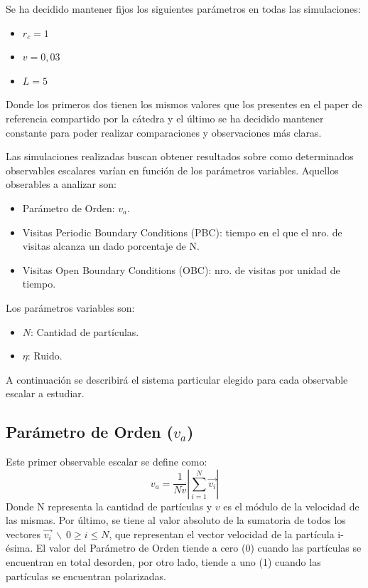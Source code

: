 \documentclass[11pt]{article}
\begin{document}
        Se ha decidido mantener fijos los siguientes parámetros en todas las simulaciones:
        \begin{itemize}
            \item $r_c = 1$
            \item $v = 0,03$
            \item $L = 5$
        \end{itemize}
        Donde los primeros dos tienen los mismos valores que los presentes en el paper de referencia
        compartido por la cátedra y el último se ha decidido mantener constante para poder realizar comparaciones
        y observaciones más claras.

        Las simulaciones realizadas buscan obtener resultados sobre como determinados observables escalares varían
        en función de los parámetros variables. Aquellos obserables a analizar son:
        \begin{itemize}
            \item Parámetro de Orden: $v_a$.
            \item Visitas Periodic Boundary Conditions (PBC): tiempo en el que el nro. de visitas alcanza un dado porcentaje de N.
            \item Visitas Open Boundary Conditions (OBC): nro. de visitas por unidad de tiempo.
        \end{itemize}
        Los parámetros variables son:
        \begin{itemize}
            \item $N$: Cantidad de partículas.
            \item $\eta$: Ruido.
        \end{itemize}

        A continuación se describirá el sistema particular elegido para cada observable escalar a estudiar.

        \subsection{Parámetro de Orden ($v_a$)}
            Este primer observable escalar se define como:
            \begin{equation}
                v_a = \frac{1}{Nv} \left|\sum_{i=1}^{N} \vec{v_i} \right|
            \end{equation}
            Donde N representa la cantidad de partículas y $v$ es el módulo de la velocidad de las mismas. Por último,
            se tiene al valor absoluto de la sumatoria de todos los vectores $\vec{v_i} \  \backslash \  0 \geq i \leq N$,
            que representan el vector velocidad de la partícula i-ésima. El valor del Parámetro de Orden tiende a cero
            (0) cuando las partículas se encuentran en total desorden, por otro lado, tiende a uno (1) cuando las partículas
            se encuentran polarizadas.
\end{document}
